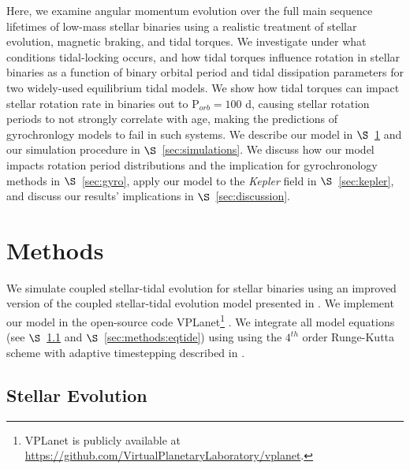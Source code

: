 \documentclass[twocolumn]{aastex61}
\newcommand{\kepler}[0]{\textit{Kepler}\xspace}
\begin{document}
Here, we examine angular momentum evolution over the full main sequence lifetimes of low-mass stellar binaries using a realistic treatment of stellar evolution, magnetic braking, and tidal torques. We investigate under what conditions tidal-locking occurs, and how tidal torques influence rotation in stellar binaries as a function of binary orbital period and tidal dissipation parameters for two widely-used equilibrium tidal models.  We show how tidal torques can impact stellar rotation rate in binaries out to P$_{orb} = 100$ d, causing stellar rotation periods to not strongly correlate with age, making the predictions of gyrochronlogy models to fail in such systems.  We describe our model in $\S$~\ref{sec:methods} and our simulation procedure in $\S$~\ref{sec:simulations}.  We discuss how our model impacts rotation period distributions and the implication for gyrochronology methods in $\S$~\ref{sec:gyro}, apply our model to the \kepler field in $\S$~\ref{sec:kepler}, and discuss our results' implications in $\S$~\ref{sec:discussion}.


\section{Methods} \label{sec:methods}

We simulate coupled stellar-tidal evolution for stellar binaries using an improved version of the coupled stellar-tidal evolution model presented in \citet{Fleming2018}.  We implement our model in the open-source code VPLanet\footnote{VPLanet is publicly available
at \href{https://github.com/VirtualPlanetaryLaboratory/vplanet}{{https://github.com/VirtualPlanetaryLaboratory/vplanet}}.} \citep[][Barnes et al., in prep]{Barnes2016,vplanet2018}.  We integrate all model equations (see $\S$~\ref{sec:methods:stellar} and $\S$~\ref{sec:methods:eqtide}) using using the $4^{th}$ order Runge-Kutta scheme with adaptive timestepping described in \citet{Fleming2018}.  

\subsection{Stellar Evolution} \label{sec:methods:stellar}
\end{document}
